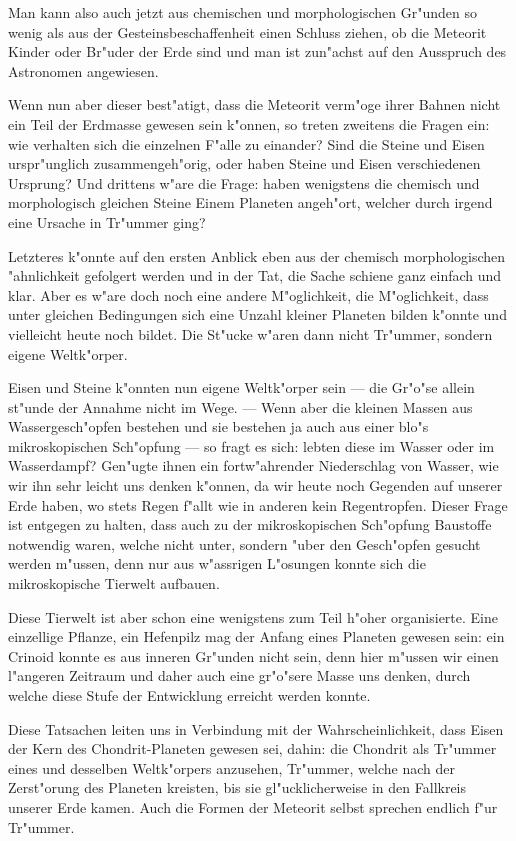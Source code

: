 \documentclass[a4paper, 11pt, oneside]{article}
\begin{document}
Man kann also auch jetzt aus chemischen und morphologischen Gr"unden so wenig als aus der Gesteinsbeschaffenheit einen Schluss ziehen, ob die Meteorit Kinder oder Br"uder der Erde sind und man ist zun"achst auf den Ausspruch des Astronomen angewiesen.

Wenn nun aber dieser best"atigt, dass die Meteorit verm"oge ihrer Bahnen nicht ein Teil der Erdmasse gewesen sein k"onnen, so treten zweitens die Fragen ein: wie verhalten sich die einzelnen F"alle zu einander? Sind die Steine und Eisen urspr"unglich zusammengeh"orig, oder haben Steine und Eisen verschiedenen Ursprung? Und drittens w"are die Frage: haben wenigstens die chemisch und morphologisch gleichen Steine Einem Planeten angeh"ort, welcher durch irgend eine Ursache in Tr"ummer ging?

Letzteres k"onnte auf den ersten Anblick eben aus der chemisch morphologischen "ahnlichkeit gefolgert werden und in der Tat, die Sache schiene ganz einfach und klar. Aber es w"are doch noch eine andere M"oglichkeit, die M"oglichkeit, dass unter gleichen Bedingungen sich eine Unzahl kleiner Planeten bilden k"onnte und vielleicht heute noch bildet. Die St"ucke w"aren dann nicht Tr"ummer, sondern eigene Weltk"orper.

Eisen und Steine k"onnten nun eigene Weltk"orper sein --- die Gr"o"se allein st"unde der Annahme nicht im Wege. --- Wenn aber die kleinen Massen aus Wassergesch"opfen bestehen und sie bestehen ja auch aus einer blo"s mikroskopischen Sch"opfung --- so fragt es sich: lebten diese im Wasser oder im Wasserdampf? Gen"ugte ihnen ein fortw"ahrender Niederschlag von Wasser, wie wir ihn sehr leicht uns denken k"onnen, da wir heute noch Gegenden auf unserer Erde haben, wo stets Regen f"allt wie in anderen kein Regentropfen. Dieser Frage ist entgegen zu halten, dass auch zu der mikroskopischen Sch"opfung Baustoffe notwendig waren, welche nicht unter, sondern "uber den Gesch"opfen gesucht werden m"ussen, denn nur aus w"assrigen L"osungen konnte sich die mikroskopische Tierwelt aufbauen.

Diese Tierwelt ist aber schon eine wenigstens zum Teil h"oher organisierte. Eine einzellige Pflanze, ein Hefenpilz mag der Anfang eines Planeten gewesen sein: ein Crinoid konnte es aus inneren Gr"unden nicht sein, denn hier m"ussen wir einen l"angeren Zeitraum und daher auch eine gr"o"sere Masse uns denken, durch welche diese Stufe der Entwicklung erreicht werden konnte.

Diese Tatsachen leiten uns in Verbindung mit der Wahrscheinlichkeit, dass Eisen der Kern des Chondrit-Planeten gewesen sei, dahin: die Chondrit als Tr"ummer eines und desselben Weltk"orpers anzusehen, Tr"ummer, welche nach der Zerst"orung des Planeten kreisten, bis sie gl"ucklicherweise in den Fallkreis unserer Erde kamen. Auch die Formen der Meteorit selbst sprechen endlich f"ur Tr"ummer.
\end{document}
